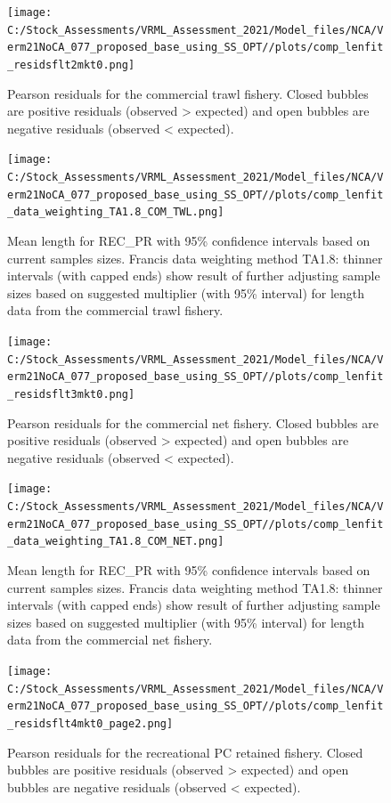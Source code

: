 \documentclass[
  english,
  a4paper,
]{article}
\begin{document}
\begin{figure}
\centering
\texttt{[image: C:/Stock\_Assessments/VRML\_Assessment\_2021/Model\_files/NCA/Verm21NoCA\_077\_proposed\_base\_using\_SS\_OPT//plots/comp\_lenfit\_residsflt2mkt0.png]}
\caption{Pearson residuals for the commercial trawl fishery. Closed bubbles are positive residuals (observed \textgreater{} expected) and open bubbles are negative residuals (observed \textless{} expected).\label{fig:len-pearson-COM-TWL}}
\end{figure}

\begin{figure}
\centering
\texttt{[image: C:/Stock\_Assessments/VRML\_Assessment\_2021/Model\_files/NCA/Verm21NoCA\_077\_proposed\_base\_using\_SS\_OPT//plots/comp\_lenfit\_data\_weighting\_TA1.8\_COM\_TWL.png]}
\caption{Mean length for REC\_PR with 95\% confidence intervals based on current samples sizes. Francis data weighting method TA1.8: thinner intervals (with capped ends) show result of further adjusting sample sizes based on suggested multiplier (with 95\% interval) for length data from the commercial trawl fishery.\label{fig:mean-len-fit-COM-TWL}}
\end{figure}

\begin{figure}
\centering
\texttt{[image: C:/Stock\_Assessments/VRML\_Assessment\_2021/Model\_files/NCA/Verm21NoCA\_077\_proposed\_base\_using\_SS\_OPT//plots/comp\_lenfit\_residsflt3mkt0.png]}
\caption{Pearson residuals for the commercial net fishery. Closed bubbles are positive residuals (observed \textgreater{} expected) and open bubbles are negative residuals (observed \textless{} expected).\label{fig:len-pearson-COM-NET}}
\end{figure}

\begin{figure}
\centering
\texttt{[image: C:/Stock\_Assessments/VRML\_Assessment\_2021/Model\_files/NCA/Verm21NoCA\_077\_proposed\_base\_using\_SS\_OPT//plots/comp\_lenfit\_data\_weighting\_TA1.8\_COM\_NET.png]}
\caption{Mean length for REC\_PR with 95\% confidence intervals based on current samples sizes. Francis data weighting method TA1.8: thinner intervals (with capped ends) show result of further adjusting sample sizes based on suggested multiplier (with 95\% interval) for length data from the commercial net fishery.\label{fig:mean-len-fit-COM-NET}}
\end{figure}

\begin{figure}
\centering
\texttt{[image: C:/Stock\_Assessments/VRML\_Assessment\_2021/Model\_files/NCA/Verm21NoCA\_077\_proposed\_base\_using\_SS\_OPT//plots/comp\_lenfit\_residsflt4mkt0\_page2.png]}
\caption{Pearson residuals for the recreational PC retained fishery. Closed bubbles are positive residuals (observed \textgreater{} expected) and open bubbles are negative residuals (observed \textless{} expected).\label{fig:len-pearson-REC-PC}}
\end{figure}
\end{document}
